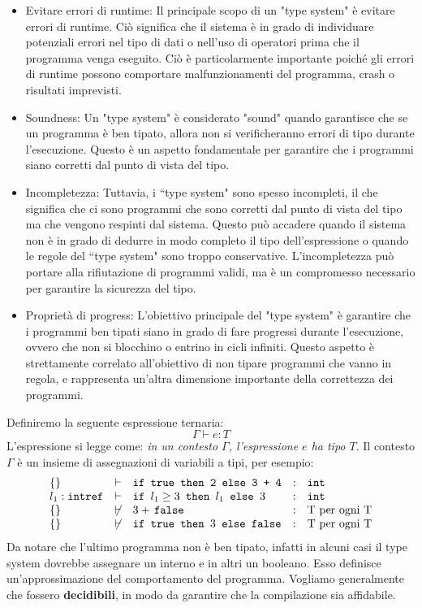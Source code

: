 \begin{itemize}
  \item Evitare errori di runtime: Il principale scopo di un "type system" è evitare errori di runtime.
  Ciò significa che il sistema è in grado di individuare potenziali errori nel tipo di dati o nell'uso
  di operatori prima che il programma venga eseguito. Ciò è particolarmente importante poiché gli errori
  di runtime possono comportare malfunzionamenti del programma, crash o risultati imprevisti.
  \item Soundness: Un "type system" è considerato "sound" quando garantisce che se un programma è
  ben tipato, allora non si verificheranno errori di tipo durante l'esecuzione. Questo è un aspetto
  fondamentale per garantire che i programmi siano corretti dal punto di vista del tipo.
  \item Incompletezza: Tuttavia, i ``type system" sono spesso incompleti, il che significa che ci
  sono programmi che sono corretti dal punto di vista del tipo ma che vengono respinti dal sistema.
  Questo può accadere quando il sistema non è in grado di dedurre in modo completo il tipo dell'espressione
  o quando le regole del ``type system" sono troppo conservative. L'incompletezza può portare alla
  rifiutazione di programmi validi, ma è un compromesso necessario per garantire la sicurezza del tipo.
  \item Proprietà di progress: L'obiettivo principale del "type system" è garantire che i
  programmi ben tipati siano in grado di fare progressi durante l'esecuzione, ovvero che non si blocchino
  o entrino in cicli infiniti. Questo aspetto è strettamente correlato all'obiettivo di non tipare programmi che
  vanno in regola, e rappresenta un'altra dimensione importante della correttezza dei programmi.
\end{itemize}
Definiremo la seguente espressione ternaria:
\[
  \Gamma \vdash e : T
\]
L'espressione si legge come: \textit{in un contesto $\Gamma$, l'espressione $e$
ha tipo $T$}. Il contesto $\Gamma$ è un insieme di assegnazioni di variabili
a tipi, per esempio:
\[
\begin{array}{lllll}
  \{\} & \vdash & \texttt{if true then 2 else 3 + 4} & : & \texttt{int} \\
  l_1:\texttt{intref} & \vdash & {\texttt{if }l_1 \geq 3\texttt{ then } l_1 \texttt{ else } 3} & : & \texttt{int} \\
  \{\} & \not \vdash & 3 + \,\texttt{false} & : & $T$ \text{ per ogni } $T$ \\
  \{\} & \not \vdash & \texttt{if true then }3 \texttt{ else false} & : & $T$ \text{ per ogni } $T$ \\
\end{array}
\]
Da notare che l'ultimo programma non è ben tipato, infatti in alcuni 
casi il type system dovrebbe assegnare un interno e in altri un booleano. Esso 
definisce un'approssimazione del comportamento del programma.
Vogliamo generalmente che fossero \textbf{decidibili}, in modo da garantire che la compilazione 
sia affidabile. 
